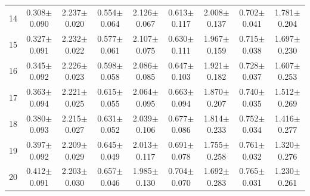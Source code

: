 \begin{table}[H]
{\begin{tabular}{c cc cc cc cc}
14 & 0.308$\pm$0.090 & 2.237$\pm$0.020 & 0.554$\pm$0.064 & 2.126$\pm$0.067 & 0.613$\pm$0.117 & 2.008$\pm$0.137 & 0.702$\pm$0.041 & 1.781$\pm$0.204 \\
15 & 0.327$\pm$0.091 & 2.232$\pm$0.022 & 0.577$\pm$0.061 & 2.107$\pm$0.075 & 0.630$\pm$0.111 & 1.967$\pm$0.159 & 0.715$\pm$0.038 & 1.697$\pm$0.230 \\
16 & 0.345$\pm$0.092 & 2.226$\pm$0.023 & 0.598$\pm$0.058 & 2.086$\pm$0.085 & 0.647$\pm$0.103 & 1.921$\pm$0.182 & 0.728$\pm$0.037 & 1.607$\pm$0.253 \\
17 & 0.363$\pm$0.094 & 2.221$\pm$0.025 & 0.615$\pm$0.055 & 2.064$\pm$0.095 & 0.663$\pm$0.094 & 1.870$\pm$0.207 & 0.740$\pm$0.035 & 1.512$\pm$0.269 \\
18 & 0.380$\pm$0.093 & 2.215$\pm$0.027 & 0.631$\pm$0.052 & 2.039$\pm$0.106 & 0.677$\pm$0.086 & 1.814$\pm$0.233 & 0.752$\pm$0.034 & 1.416$\pm$0.277 \\
19 & 0.397$\pm$0.092 & 2.209$\pm$0.029 & 0.645$\pm$0.049 & 2.013$\pm$0.117 & 0.691$\pm$0.078 & 1.755$\pm$0.258 & 0.761$\pm$0.032 & 1.320$\pm$0.276 \\
20 & 0.412$\pm$0.091 & 2.203$\pm$0.030 & 0.657$\pm$0.046 & 1.985$\pm$0.130 & 0.704$\pm$0.070 & 1.692$\pm$0.283 & 0.765$\pm$0.031 & 1.230$\pm$0.261 \\

\bottomrule

\end{tabular}
}
\end{table}
